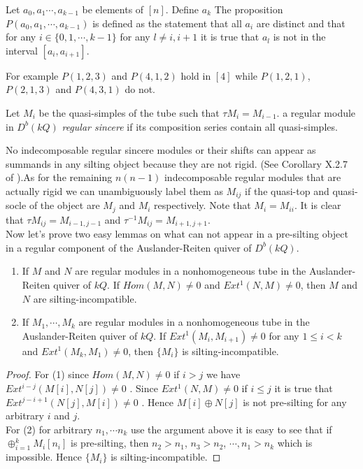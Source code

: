 \begin{definition}
Let $a_0, a_1\cdots, a_{k-1}$ be elements of $[n]$. Define $a_k$ The proposition $P(a_0, a_1,\cdots, a_{k-1})$ is defined as the statement that all $a_i$ are distinct and that for any $i\in\{0,1,\cdots, k-1\}$ for any $l\neq i, i+1$ it is true that $a_l$ is not in the interval $[a_i, a_{i+1}]$.
\end{definition}
\indent For example $P(1,2,3)$ and $P(4,1,2)$ hold in $[4]$ while $P(1,2,1)$, $P(2,1,3)$ and $P(4,3,1)$ do not.\\
\begin{definition}
Let $M_i$ be the quasi-simples of the tube such that $\tau M_i=M_{i-1}$. a regular module in $D^b(kQ)$ \textit{regular sincere} if its composition series contain all quasi-simples.
\end{definition}
\indent No indecomposable regular sincere modules or their shifts can appear as summands in any silting object because they are not rigid. (See Corollary X.2.7 of \cite{SS06}).As for the remaining $n(n-1)$ indecomposable regular modules that are actually rigid we can unambiguously label them as $M_{ij}$ if the quasi-top and quasi-socle of the object are $M_j$ and $M_i$ respectively. Note that $M_i=M_{ii}$. It is clear that $\tau M_{ij}=M_{i-1,j-1}$ and $\tau^{-1} M_{ij}=M_{i+1,j+1}$.\\
\indent Now let's prove two easy lemmas on what can not appear in a pre-silting object in a regular component of the Auslander-Reiten quiver of $D^b(kQ)$.\\
\begin{lemma}
\begin{enumerate}\label{lem:C3LN}
\item If $M$ and $N$ are regular modules in a nonhomogeneous tube in the Auslander-Reiten quiver of $kQ$. If $Hom(M,N)\neq 0$ and $Ext^1(N,M)\neq 0$, then $M$ and $N$ are silting-incompatible.\\
\item If $M_1,\cdots, M_k$ are regular modules in a nonhomogeneous tube in the Auslander-Reiten quiver of $kQ$. If $Ext^1(M_i,M_{i+1})\neq 0$ for any $1\leq i<k$  and $Ext^1(M_k,M_1)\neq 0$, then $\{M_i\}$  is silting-incompatible.\\
\end{enumerate}
\end{lemma}
\begin{proof}
\indent For (1) since $Hom(M,N)\neq 0$ if $i>j$ we have $Ext^{i-j}(M[i],N[j])\neq 0$ . Since $Ext^1(N,M)\neq 0$ if $i\leq j$ it is true that $Ext^{j-i+1}(N[j],M[i])\neq 0$ . Hence $M[i]\oplus N[j]$ is not pre-silting for any arbitrary $i$ and $j$.\\
\indent For (2) for arbitrary $n_1,\cdots n_k$ use the argument above it is easy to see that if $\oplus_{i=1}^kM_i[n_i]$ is pre-silting, then $n_2>n_1$, $n_3>n_2$, $\cdots, n_1>n_k$ which is impossible. Hence $\{M_i\}$  is silting-incompatible.
\end{proof}
